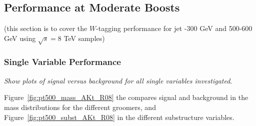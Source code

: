 \subsection{Performance at Moderate Boosts}

(this section is to cover the $W$-tagging performance for jet -300 GeV and
500-600 GeV using $\sqrt{s} = 8$ TeV samples)

\subsubsection{Single Variable Performance}

{\it Show plots of signal versus background for all single variables investigated}.

Figure~\ref{fig:pt500_mass_AKt_R08} the compares signal and background
 in the mass distributions for the different groomers, and Figure~\ref{fig:pt500_subst_AKt_R08}
in the different substructure variables. 

